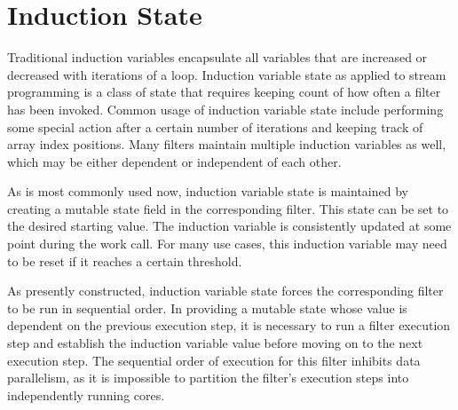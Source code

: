 \section{Induction State}
\label{sec:inductionstate}

  





Traditional induction variables encapsulate all variables that are
increased or decreased with iterations of a loop.  Induction variable
state as applied to stream programming is a class of state that
requires keeping count of how often a filter has been invoked.  Common
usage of induction variable state include performing some special
action after a certain number of iterations and keeping track of array
index positions.  Many filters maintain multiple induction variables
as well, which may be either dependent or independent of each other.

As is most commonly used now, induction variable state is maintained
by creating a mutable state field in the corresponding filter.  This
state can be set to the desired starting value.  The induction
variable is consistently updated at some point during the work call.
For many use cases, this induction variable may need to be reset if it
reaches a certain threshold. 

As presently constructed, induction variable state forces the
corresponding filter to be run in sequential order.  In providing a
mutable state whose value is dependent on the previous execution step,
it is necessary to run a filter execution step and establish the
induction variable value before moving on to the next execution step.
The sequential order of execution for this filter inhibits data
parallelism, as it is impossible to partition the filter's execution
steps into independently running cores.


